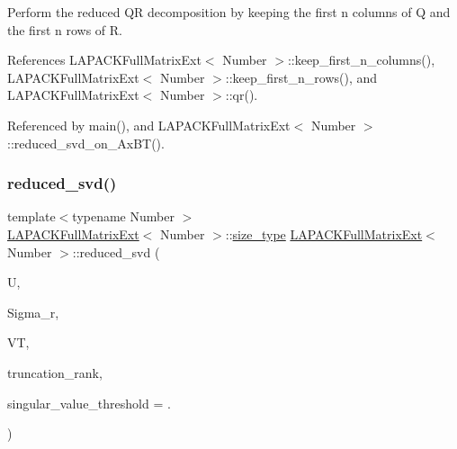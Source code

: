 Perform the reduced QR decomposition by keeping the first {\ttfamily n} columns of Q and the first {\ttfamily n} rows of R.

References L\+A\+P\+A\+C\+K\+Full\+Matrix\+Ext$<$ Number $>$\+::keep\+\_\+first\+\_\+n\+\_\+columns(), L\+A\+P\+A\+C\+K\+Full\+Matrix\+Ext$<$ Number $>$\+::keep\+\_\+first\+\_\+n\+\_\+rows(), and L\+A\+P\+A\+C\+K\+Full\+Matrix\+Ext$<$ Number $>$\+::qr().



Referenced by main(), and L\+A\+P\+A\+C\+K\+Full\+Matrix\+Ext$<$ Number $>$\+::reduced\+\_\+svd\+\_\+on\+\_\+\+Ax\+B\+T().

\mbox{\label{classLAPACKFullMatrixExt_a0a6e1d0e88bc84b372b1d0a0f4b79f86}} 
\subsubsection{\texorpdfstring{reduced\+\_\+svd()}{reduced\_svd()}\hspace{0.1cm}{\footnotesize\ttfamily [1/2]}}
{\footnotesize\ttfamily template$<$typename Number $>$ \\
\hyperlink{classLAPACKFullMatrixExt}{L\+A\+P\+A\+C\+K\+Full\+Matrix\+Ext}$<$ Number $>$\+::\hyperlink{classLAPACKFullMatrixExt_a5cf5f4a6104dc17029210b5ca52bf574}{size\+\_\+type} \hyperlink{classLAPACKFullMatrixExt}{L\+A\+P\+A\+C\+K\+Full\+Matrix\+Ext}$<$ Number $>$\+::reduced\+\_\+svd (\begin{DoxyParamCaption}\item[{\hyperlink{classLAPACKFullMatrixExt}{L\+A\+P\+A\+C\+K\+Full\+Matrix\+Ext}$<$ Number $>$ \&}]{U,  }\item[{std\+::vector$<$ typename numbers\+::\+Number\+Traits$<$ Number $>$\+::real\+\_\+type $>$ \&}]{Sigma\+\_\+r,  }\item[{\hyperlink{classLAPACKFullMatrixExt}{L\+A\+P\+A\+C\+K\+Full\+Matrix\+Ext}$<$ Number $>$ \&}]{VT,  }\item[{\hyperlink{classLAPACKFullMatrixExt_a5cf5f4a6104dc17029210b5ca52bf574}{size\+\_\+type}}]{truncation\+\_\+rank,  }\item[{Number}]{singular\+\_\+value\+\_\+threshold = {.} }\end{DoxyParamCaption})}

